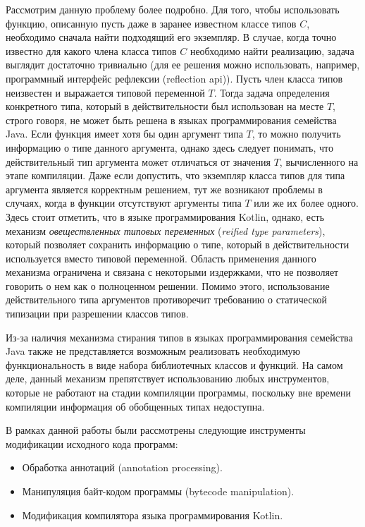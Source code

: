 Рассмотрим данную проблему более подробно. Для того, чтобы использовать функцию, описанную пусть даже в заранее известном классе типов $C$, необходимо сначала найти подходящий его экземпляр. В случае, когда точно известно для какого члена класса типов $C$ необходимо найти реализацию, задача выглядит достаточно тривиально (для ее решения можно использовать, например, программный интерфейс рефлексии (reflection api)). Пусть член класса типов неизвестен и выражается типовой переменной $T$. Тогда задача определения конкретного типа, который в действительности был использован на месте $T$, строго говоря, не может быть решена в языках программирования семейства Java. Если функция имеет хотя бы один аргумент типа $T$, то можно получить информацию о типе данного аргумента, однако здесь следует понимать, что действительный тип аргумента может отличаться от значения $T$, вычисленного на этапе компиляции. Даже если допустить, что экземпляр класса типов для типа аргумента является корректным решением, тут же возникают проблемы в случаях, когда в функции отсутствуют аргументы типа $T$ или же их более одного. Здесь стоит отметить, что в языке программирования Kotlin, однако, есть механизм \emph{овеществленных типовых переменных} (\emph{reified type parameters}), который позволяет сохранить информацию о типе, который в действительности используется вместо типовой переменной. Область применения данного механизма ограничена и связана с некоторыми издержками, что не позволяет говорить о нем как о полноценном решении. Помимо этого, использование действительного типа аргументов противоречит требованию о статической типизации при разрешении классов типов.

Из-за наличия механизма стирания типов в языках программирования семейства Java также не представляется возможным реализовать необходимую функциональность в виде набора библиотечных классов и функций. На самом деле, данный механизм препятствует использованию любых инструментов, которые не работают на стадии компиляции программы, поскольку вне времени компиляции информация об обобщенных типах недоступна. 

В рамках данной работы были рассмотрены следующие инструменты модификации исходного кода программ:
\begin{itemize}
    \item Обработка аннотаций (annotation processing).
    \item Манипуляция байт-кодом программы (bytecode manipulation).
    \item Модификация компилятора языка программирования Kotlin.  
\end{itemize}

